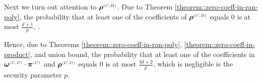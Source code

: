 Next we turn out attention to $\bm\rho^{\scriptscriptstyle (C,D)}$. Due to Theorem \ref{theorem::zero-coeff-in-ran-poly}, the probability that at least one of the coefficients of $\bm\rho^{\scriptscriptstyle (C,D)}$ equals $0$ is at most $\frac{d+1}{p}$, . 

%
%

Hence, due to Theorems \ref{theorem::zero-coeff-in-ran-poly}, \ref{theorem::zero-coeff-in-product}, and union bound, the probability that at least one of the coefficients in $\bm\omega^{\scriptscriptstyle (C,D)}\cdot \bm\pi^{\scriptscriptstyle  {  {(C)}}}$ and  $\bm\rho^{\scriptscriptstyle (C,D)}$ equals $0$ is at most $\frac{3d+2}{p}$, which is negligible is the security parameter $p$. 















